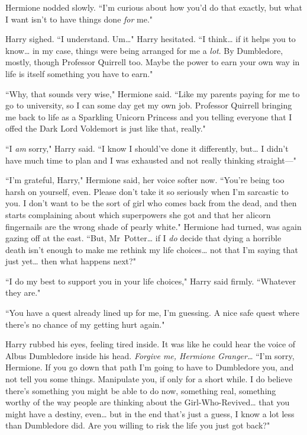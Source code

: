 Hermione nodded slowly. ``I'm curious about how you'd do that exactly, but what I want isn't to have things done \emph{for} me."

Harry sighed. ``I understand. Um{\ldots}" Harry hesitated. ``I think{\ldots} if it helps you to know{\ldots} in my case, things were being arranged for me a \emph{lot}. By Dumbledore, mostly, though Professor Quirrell too. Maybe the power to earn your own way in life is itself something you have to earn."

``Why, that sounds very wise," Hermione said. ``Like my parents paying for me to go to university, so I can some day get my own job. Professor Quirrell bringing me back to life as a Sparkling Unicorn Princess and you telling everyone that I offed the Dark Lord Voldemort is just like that, really."

``I \emph{am} sorry," Harry said. ``I know I should've done it differently, but{\ldots} I didn't have much time to plan and I was exhausted and not really thinking straight—"

``I'm grateful, Harry," Hermione said, her voice softer now. ``You're being too harsh on yourself, even. Please don't take it so seriously when I'm sarcastic to you. I don't want to be the sort of girl who comes back from the dead, and then starts complaining about which superpowers she got and that her alicorn fingernails are the wrong shade of pearly white." Hermione had turned, was again gazing off at the east. ``But, Mr~Potter{\ldots} if I \emph{do} decide that dying a horrible death isn't enough to make me rethink my life choices{\ldots} not that I'm saying that just yet{\ldots} then what happens next?"

``I do my best to support you in your life choices," Harry said firmly. ``Whatever they are."

``You have a quest already lined up for me, I'm guessing. A nice safe quest where there's no chance of my getting hurt again."

Harry rubbed his eyes, feeling tired inside. It was like he could hear the voice of Albus Dumbledore inside his head. \emph{Forgive me, Hermione Granger{\ldots}} ``I'm sorry, Hermione. If you go down that path I'm going to have to Dumbledore you, and not tell you some things. Manipulate you, if only for a short while. I do believe there's something you might be able to do now, something real, something worthy of the way people are thinking about the Girl-Who-Revived{\ldots} that you might have a destiny, even{\ldots} but in the end that's just a guess, I know a lot less than Dumbledore did. Are you willing to risk the life you just got back?"

